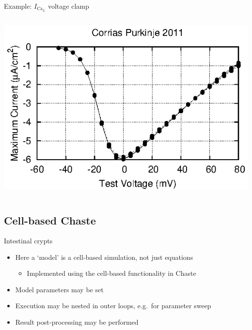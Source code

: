 \documentclass[t,xcolor={usenames,dvipsnames}]{beamer}
\newcommand{\subitem}[1]{\begin{itemize}[<.->]\item #1 \end{itemize}}
\begin{document}
\begin{frame}{Example: $I_{\textrm{Ca}_L}$ voltage clamp}
\begin{columns}[T]
\begin{column}{.33\linewidth}
\begin{center}
\vspace{.1cm}
\includegraphics[width=\textwidth]{corrias_purkinje_2011_ICaL_IV_curve}
\end{center}
\end{column}
\end{columns}
\end{frame}


\subsection*{Cell-based Chaste}

\begin{frame}{Intestinal crypts}
\begin{itemize}
\item Here a `model' is a cell-based \alert{simulation}, not just equations
  \subitem{Implemented using the cell-based functionality in Chaste}
\item Model parameters may be set
\item Execution may be nested in outer loops, e.g.\ for parameter sweep
\item Result post-processing may be performed
\end{itemize}
\end{frame}
\end{document}
